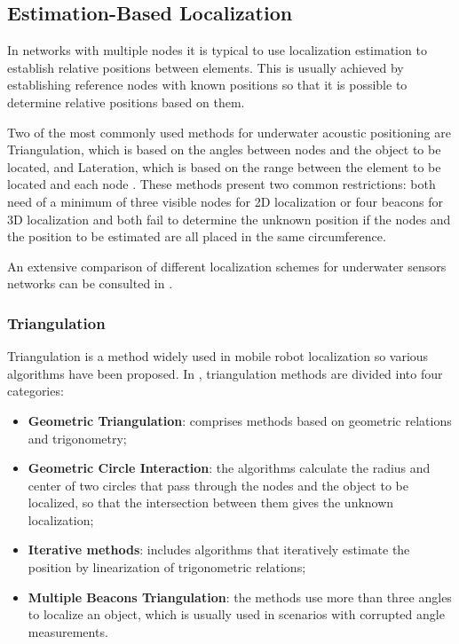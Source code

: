 
\subsection{Estimation-Based Localization}

In networks with multiple nodes it is typical to use localization estimation to establish relative positions between elements. This is usually achieved by establishing reference nodes with known positions so that it is possible to determine relative positions based on them.

Two of the most commonly used methods for underwater acoustic positioning are Triangulation, which is based on the angles between nodes and the object to be located,  and Lateration, which is based on the range between the element to be located and each node \cite{triang-later}. These methods present two common restrictions: both need of a minimum of three visible nodes for 2D localization or four beacons for 3D localization and both fail to determine the unknown position if the nodes and the position to be estimated are all placed in the same circumference.

An extensive comparison of different localization schemes for underwater sensors networks can be consulted in \cite{suvey-loc}. 

\subsubsection{Triangulation}

Triangulation is a method widely used in mobile robot localization so various algorithms have been proposed. In \cite{class-triang}, triangulation methods are divided into four categories: 

\begin{itemize}
	\item \textbf{Geometric Triangulation}: comprises methods based on geometric relations and trigonometry;
	
	\item \textbf{Geometric Circle Interaction}: the algorithms calculate the radius and center of two circles that pass through the nodes and the object to be localized, so that the intersection between them gives the unknown localization;
		
	\item \textbf{Iterative methods}: includes algorithms that iteratively estimate the position by linearization of trigonometric relations;
	
	\item \textbf{Multiple Beacons Triangulation}: the methods use more than three angles to localize an object, which is usually used in scenarios with corrupted angle measurements.
\end{itemize}

